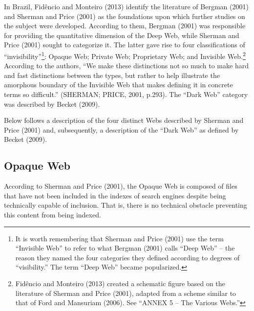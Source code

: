 In Brazil, Fid\^{e}ncio and Monteiro (2013) identify the literature of Bergman (2001) and Sherman and Price (2001) as the foundations upon which further studies on the subject were developed. According to them, Bergman (2001) was responsible for providing the quantitative dimension of the Deep Web, while Sherman and Price (2001) sought to categorize it. The latter gave rise to four classifications of ``invisibility''\footnote{It is worth remembering that Sherman and Price (2001) use the term ``Invisible Web'' to refer to what Bergman (2001) calls ``Deep Web'' -- the reason they named the four categories they defined according to degrees of ``visibility.'' The term ``Deep Web'' became popularized.}: Opaque Web; Private Web; Proprietary Web; and Invisible Web.\footnote{Fid\^{e}ncio and Monteiro (2013) created a schematic figure based on the literature of Sherman and Price (2001), adapted from a scheme similar to that of Ford and Mansuriam (2006). See ``ANNEX 5 -- The Various Webs.''} According to the authors, ``We make these distinctions not so much to make hard and fast distinctions between the types, but rather to help illustrate the amorphous boundary of the Invisible Web that makes defining it in concrete terms so difficult.'' (SHERMAN; PRICE, 2001, p.293). The ``Dark Web'' category was described by Becket (2009).

Below follows a description of the four distinct Webs described by Sherman and Price (2001) and, subsequently, a description of the ``Dark Web'' as defined by Becket (2009).

\subsection{Opaque Web}

According to Sherman and Price (2001), the Opaque Web is composed of files that have not been included in the indexes of search engines despite being technically capable of inclusion. That is, there is no technical obstacle preventing this content from being indexed.

